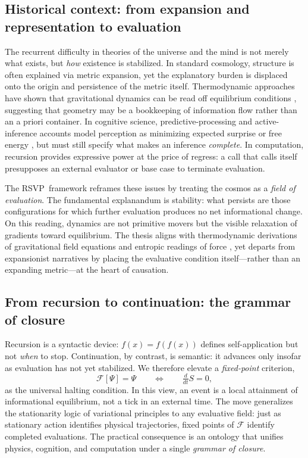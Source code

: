 \documentclass[12pt,a4paper]{article}
\newcommand{\Ss}{S}                   %
\newcommand{\RSVP}{RSVP}              %
\newcommand{\ddt}{\tfrac{d}{dt}}      %
\newcommand{\State}{\Psi}             %
\newcommand{\F}{\mathcal{F}}          %
\theoremstyle{plain}
\begin{document}
\subsection{Historical context: from expansion and representation to evaluation}
The recurrent difficulty in theories of the universe and the mind is not merely what exists, but \emph{how} existence is stabilized. In standard cosmology, structure is often explained via metric expansion, yet the explanatory burden is displaced onto the origin and persistence of the metric itself. Thermodynamic approaches have shown that gravitational dynamics can be read off equilibrium conditions \citep{jacobson1995thermodynamics,verlinde2011origin}, suggesting that geometry may be a bookkeeping of information flow rather than an a priori container. In cognitive science, predictive-processing and active-inference accounts model perception as minimizing expected surprise or free energy \citep{friston2023active,clark2023brains,seth2022predictive}, but must still specify what makes an inference \emph{complete}. In computation, recursion provides expressive power at the price of regress: a call that calls itself presupposes an external evaluator or base case to terminate evaluation.

The \RSVP\ framework reframes these issues by treating the cosmos as a \emph{field of evaluation}. The fundamental explanandum is stability: what persists are those configurations for which further evaluation produces no net informational change. On this reading, dynamics are not primitive movers but the visible relaxation of gradients toward equilibrium. The thesis aligns with thermodynamic derivations of gravitational field equations \citep{jacobson1995thermodynamics} and entropic readings of force \citep{verlinde2011origin}, yet departs from expansionist narratives by placing the evaluative condition itself---rather than an expanding metric---at the heart of causation.

\subsection{From recursion to continuation: the grammar of closure}
Recursion is a syntactic device: \(f(x)=f(f(x))\) defines self-application but not \emph{when} to stop. Continuation, by contrast, is semantic: it advances only insofar as evaluation has not yet stabilized. We therefore elevate a \emph{fixed-point} criterion,
\begin{equation}
\label{eq:fpc-law}
\F[\State]=\State
\qquad\Longleftrightarrow\qquad
\ddt \Ss=0,
\end{equation}
as the universal halting condition. In this view, an event is a local attainment of informational equilibrium, not a tick in an external time. The move generalizes the stationarity logic of variational principles to any evaluative field: just as stationary action identifies physical trajectories, fixed points of \(\F\) identify completed evaluations. The practical consequence is an ontology that unifies physics, cognition, and computation under a single \emph{grammar of closure}.
\end{document}
